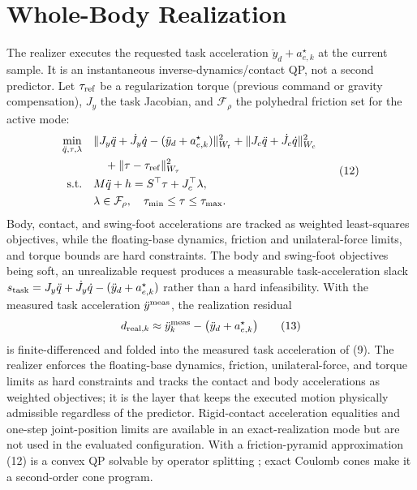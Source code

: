 \documentclass[journal]{IEEEtran}
\theoremstyle{plain}
\theoremstyle{definition}
\theoremstyle{remark}
\begin{document}
\section{Whole-Body Realization}\label{sec:realizer}

The realizer executes the requested task acceleration $\ddot y_d+a_{e,k}^\star$ at the current sample. It is an instantaneous inverse-dynamics/contact QP, not a second predictor. Let $\tau_{\rm ref}$ be a regularization torque (previous command or gravity compensation), $J_y$ the task Jacobian, and $\mathcal F_\rho$ the polyhedral friction set for the active mode:
\begin{equation}
\begin{aligned}
\min_{\ddot q,\tau,\lambda}\quad&
\|J_y\ddot q+\dot J_y\dot q-(\ddot y_d+a_{e,k}^\star)\|_{W_t}^2
+\|J_c\ddot q+\dot J_c\dot q\|_{W_c}^2\\
&\quad+\|\tau-\tau_{\rm ref}\|_{W_\tau}^2\\
\text{s.t.}\quad&
M\ddot q+h=S^\top\tau+J_c^\top\lambda,\\
&\lambda\in\mathcal F_\rho,\quad \tau_{\min}\le\tau\le\tau_{\max}.
\end{aligned}
\tag{12}
\end{equation}
Body, contact, and swing-foot accelerations are tracked as weighted least-squares objectives, while the floating-base dynamics, friction and unilateral-force limits, and torque bounds are hard constraints. The body and swing-foot objectives being soft, an unrealizable request produces a measurable task-acceleration slack $s_{\rm task}=J_y\ddot q+\dot J_y\dot q-(\ddot y_d+a_{e,k}^\star)$ rather than a hard infeasibility. With the measured task acceleration $\ddot y^{\rm meas}$, the realization residual
\begin{equation}
d_{{\rm real},k}\approx\ddot y^{\rm meas}_k-\big(\ddot y_d+a_{e,k}^\star\big)
\tag{13}
\end{equation}
is finite-differenced and folded into the measured task acceleration of (9). The realizer enforces the floating-base dynamics, friction, unilateral-force, and torque limits as hard constraints and tracks the contact and body accelerations as weighted objectives; it is the layer that keeps the executed motion physically admissible regardless of the predictor. Rigid-contact acceleration equalities and one-step joint-position limits are available in an exact-realization mode but are not used in the evaluated configuration. With a friction-pyramid approximation (12) is a convex QP solvable by operator splitting \cite{ref14}; exact Coulomb cones make it a second-order cone program.
\end{document}
